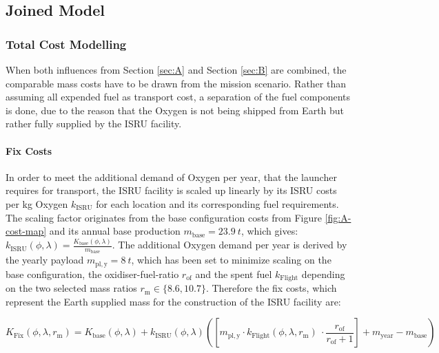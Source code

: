 \documentclass[utf8]{FrontiersinHarvard} %
\begin{document}
\newpage

\subsection{Joined Model}
\label{sec:joined-model}

\subsubsection{Total Cost Modelling}

When both influences from Section \ref{sec:A} and Section \ref{sec:B} are combined, the comparable mass costs have to be drawn from the mission scenario.
Rather than assuming all expended fuel as transport cost, a separation of the fuel components is done, due to the reason that the Oxygen is not being shipped from Earth but rather fully supplied by the ISRU facility.

\paragraph{Fix Costs}
In order to meet the additional demand of Oxygen per year, that the launcher requires for transport, the ISRU facility is scaled up linearly by its ISRU costs per kg Oxygen $k_{\mathrm{ISRU}}$ for each location and its corresponding fuel requirements. 
The scaling factor originates from the base configuration costs from Figure \ref{fig:A-cost-map} and its annual base production $m_{\mathrm{base}}=23.9 \ t$, which gives: $k_{\mathrm{ISRU}}(\phi,\lambda) = \frac{K_{\mathrm{base}}(\phi,\lambda)}{m_{\mathrm{base}}}$.
The additional Oxygen demand per year is derived by the yearly payload $ m_{\mathrm{pl,y}}= 8 \ t$, which has been set to minimize scaling on the base configuration, the oxidiser-fuel-ratio $r_{\mathrm{of}}$ and the spent fuel $k_{\mathrm{Flight}}$ depending on the two selected mass ratios $r_{\mathrm{m}} \in \lbrace 8.6,10.7 \rbrace$.
Therefore the fix costs, which represent the Earth supplied mass for the  construction of the ISRU facility are:

\begin{equation}
\displaystyle K_{\mathrm{Fix}}(\phi,\lambda,r_{\mathrm{m}})=  K_{\mathrm{base}}(\phi,\lambda) +  k_{\mathrm{ISRU}}(\phi,\lambda) \left (  \left [ m_{\mathrm{pl,y}} \cdot k_{\mathrm{Flight}}(\phi,\lambda,r_{\mathrm{m}}) \  \cdot \frac{r_{\mathrm{of}}}{r_{\mathrm{of}}+1} \right ] +  m_{\mathrm{year}} -  m_{\mathrm{base}} \right )
\label{eq:K_fix}
\end{equation}
\end{document}
